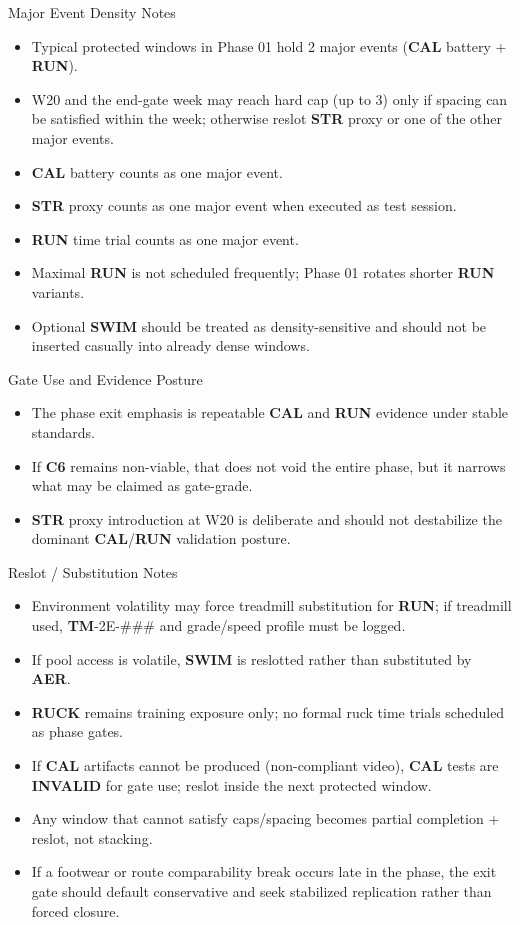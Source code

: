 \documentclass[10pt]{article}
\begin{document}
Major Event Density Notes

\begin{itemize}
\item Typical protected windows in Phase 01 hold 2 major events (\textbf{CAL} battery + \textbf{RUN}).
\item W20 and the end-gate week may reach hard cap (up to 3) only if spacing can be satisfied within the week; otherwise reslot \textbf{STR} proxy or one of the other major events.
\item \textbf{CAL} battery counts as one major event.
\item \textbf{STR} proxy counts as one major event when executed as test session.
\item \textbf{RUN} time trial counts as one major event.
\item Maximal \textbf{RUN} is not scheduled frequently; Phase 01 rotates shorter \textbf{RUN} variants.
\item Optional \textbf{SWIM} should be treated as density-sensitive and should not be inserted casually into already dense windows.
\end{itemize}

Gate Use and Evidence Posture

\begin{itemize}
\item The phase exit emphasis is repeatable \textbf{CAL} and \textbf{RUN} evidence under stable standards.
\item If \textbf{C6} remains non-viable, that does not void the entire phase, but it narrows what may be claimed as gate-grade.
\item \textbf{STR} proxy introduction at W20 is deliberate and should not destabilize the dominant \textbf{CAL}/\textbf{RUN} validation posture.
\end{itemize}

Reslot / Substitution Notes

\begin{itemize}
\item Environment volatility may force treadmill substitution for \textbf{RUN}; if treadmill used, \textbf{TM}-2E-### and grade/speed profile must be logged.
\item If pool access is volatile, \textbf{SWIM} is reslotted rather than substituted by \textbf{AER}.
\item \textbf{RUCK} remains training exposure only; no formal ruck time trials scheduled as phase gates.
\item If \textbf{CAL} artifacts cannot be produced (non-compliant video), \textbf{CAL} tests are \textbf{INVALID} for gate use; reslot inside the next protected window.
\item Any window that cannot satisfy caps/spacing becomes partial completion + reslot, not stacking.
\item If a footwear or route comparability break occurs late in the phase, the exit gate should default conservative and seek stabilized replication rather than forced closure.
\end{itemize}
\end{document}
